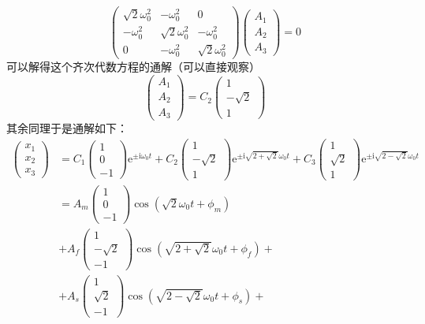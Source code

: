 \documentclass[11pt]{book}
\begin{document}
\begin{equation}
\label{eq:19}
\begin{pmatrix}
\sqrt{2}\omega_0^2 & -\omega_0^2 & 0\\
-\omega_0^2 & \sqrt{2}\omega_0^2 & -\omega_0^2\\
0 & -\omega_0^2 & \sqrt{2}\omega_0^2
\end{pmatrix}
\begin{pmatrix}
A_1\\A_2\\A_3
\end{pmatrix}=0
\end{equation}
可以解得这个齐次代数方程的通解（可以直接观察）
\begin{equation}
\label{eq:22}
\begin{pmatrix}
A_1\\A_2\\A_3
\end{pmatrix}
=C_2
\begin{pmatrix}
1\\-\sqrt{2}\\1
\end{pmatrix}
\end{equation}
其余同理于是通解如下：
\begin{equation}
\label{eq:23}
\begin{split}
\begin{pmatrix}
x_1\\x_2\\x_3
\end{pmatrix}
&=C_1
\begin{pmatrix}
1\\0\\-1
\end{pmatrix}
\mathrm{e}^{\pm\mathrm{i}\omega_0 t}
+C_2
\begin{pmatrix}
1\\-\sqrt{2}\\1
\end{pmatrix}
\mathrm{e}^{\pm\mathrm{i}\sqrt{2+\sqrt{2}}\omega_0 t}
+C_3
\begin{pmatrix}
1\\\sqrt{2}\\1
\end{pmatrix}
\mathrm{e}^{\pm\mathrm{i}\sqrt{2-\sqrt{2}}\omega_0 t}\\
&=A_m
\begin{pmatrix}
1\\0\\-1
\end{pmatrix}
\cos(\sqrt{2}\omega_0 t+\phi_{m})\\
&+A_f
\begin{pmatrix}
1\\-\sqrt{2}\\-1
\end{pmatrix}
\cos(\sqrt{2+\sqrt{2}}\omega_0 t+\phi_{f})+\\
&+A_s
\begin{pmatrix}
1\\\sqrt{2}\\-1
\end{pmatrix}
\cos(\sqrt{2-\sqrt{2}}\omega_0 t+\phi_{s})+\\
\end{split}
\end{equation}
\end{document}
